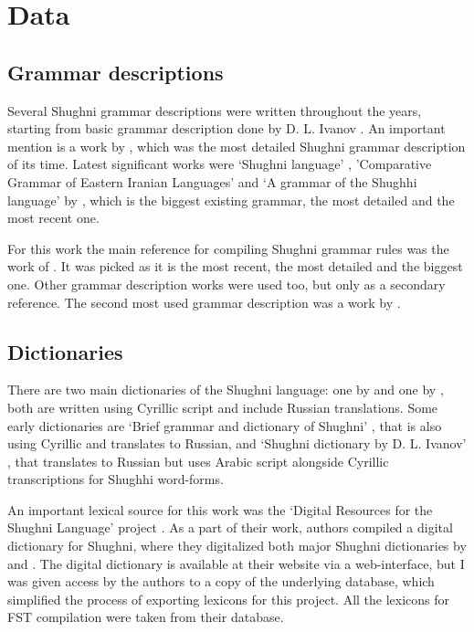 \section{Data} \label{data_section}

\subsection{Grammar descriptions}
Several Shughni grammar descriptions were written throughout the years, starting from basic grammar description done by D. L. Ivanov \parencite[274-281]{salemann_dict_1895}. An important mention is a work by \textcite{karamshoev_dialect_1963}, which was the most detailed Shughni grammar description of its time. Latest significant works were `Shughni language' \parencite[225-242]{edelman_languages_1999}, 'Comparative Grammar of Eastern Iranian Languages' \parencite{edelman_gram_2009} and `A grammar of the Shughhi language' by \textcite{parker_shughni_2023}, which is the biggest existing grammar, the most detailed and the most recent one.

For this work the main reference for compiling Shughni grammar rules was the work of \textcite{parker_shughni_2023}. It was picked as it is the most recent, the most detailed and the biggest one. Other grammar description works were used too, but only as a secondary reference. The second most used grammar description was a work by \textcite{edelman_languages_1999}.

\subsection{Dictionaries}
There are two main dictionaries of the Shughni language: one by \textcite{zarubin_dict_1960} and one by \textcite{karamshoev_dict_1988}, both are written using Cyrillic script and include Russian translations. Some early dictionaries are `Brief grammar and dictionary of Shughni' \parencite{tumanovich_gram_1906}, that is also using Cyrillic and translates to Russian, and `Shughni dictionary by D. L. Ivanov' \parencite{salemann_dict_1895}, that translates to Russian but uses Arabic script alongside Cyrillic transcriptions for Shughhi word-forms.

An important lexical source for this work was the `Digital Resources for the Shughni Language' project \parencite{makarov_digital_2022}. As a part of their work, authors compiled a digital dictionary for Shughni, where they digitalized both major Shughni dictionaries by \textcite{karamshoev_dict_1988} and \textcite{zarubin_dict_1960}. The digital dictionary is available at their website via a web-interface, but I was given access by the authors to a copy of the underlying database, which simplified the process of exporting lexicons for this project. All the lexicons for FST compilation were taken from their database.

